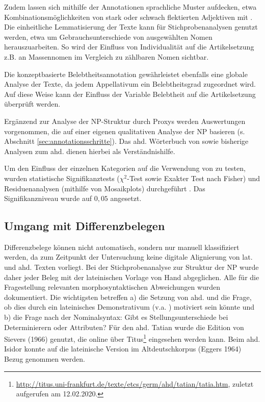 Zudem lassen sich mithilfe der Annotationen sprachliche Muster aufdecken, etwa Kombinationsmöglichkeiten von stark oder schwach flektierten Adjektiven mit . Die einheitliche Lemmatisierung der Texte kann für Stichprobenanalysen genutzt werden, etwa um Gebrauchsunterschiede  von ausgewählten Nomen herauszuarbeiten. So wird der Einfluss von Individualität auf die Artikelsetzung z.B. an Massennomen im Vergleich zu zählbaren Nomen sichtbar.

Die konzeptbasierte Belebtheitsannotation gewährleistet ebenfalls eine globale Analyse der Texte, da jedem Appellativum ein Belebtheitsgrad zugeordnet wird. Auf diese Weise kann der Einfluss der Variable Belebtheit auf die Artikelsetzung überprüft werden. 

Ergänzend zur Analyse der NP-Struktur durch Proxys werden Auswertungen vorgenommen, die auf einer eigenen qualitativen Analyse der NP basieren (s. Abschnitt \ref{sec:annotationsschritte}). Das ahd. Wörterbuch von \textcite{Schutzeichel2012} sowie bisherige Analysen zum ahd.  \parencite[v.a.][]{Oubouzar1989} dienen hierbei als Verständnishilfe.  

Um den Einfluss der einzelnen Kategorien auf die Verwendung von  zu testen, wurden statistische Signifikanztests ($\chi^2$-Test sowie Exakter Test nach Fisher) und Residuenanalysen (mithilfe von Mosaikplots) durchgeführt \parencite{Gries2013}. Das Signifikanzniveau wurde auf $0,05$ angesetzt.

\subsection{Umgang mit Differenzbelegen}\label{sec:differenz}

Differenzbelege können nicht automatisch, sondern nur manuell klassifiziert werden, da zum Zeitpunkt der Untersuchung keine digitale Alignierung von lat. und ahd. Texten vorliegt. Bei der Stichprobenanalyse zur Struktur der NP wurde daher jeder Beleg mit der lateinischen Vorlage von Hand abgeglichen. Alle für die Fragestellung relevanten morphosyntaktischen Abweichungen wurden dokumentiert. Die wichtigsten betreffen a) die Setzung von ahd.  und die Frage, ob dies durch ein lateinisches Demonstrativum (v.a. ) motiviert sein könnte und b) die Frage nach der Nominalsyntax: Gibt es Stellungsunterschiede bei Determinierern oder Attributen? Für den ahd. Tatian wurde die Edition von Sievers (1966) genutzt, die online über Titus\footnote{\url{http://titus.uni-frankfurt.de/texte/etcs/germ/ahd/tatian/tatia.htm}, zuletzt aufgerufen am 12.02.2020.} eingesehen werden kann. Beim ahd. Isidor konnte auf die lateinische Version im Altdeutschkorpus (Eggers 1964) Bezug genommen werden.  


